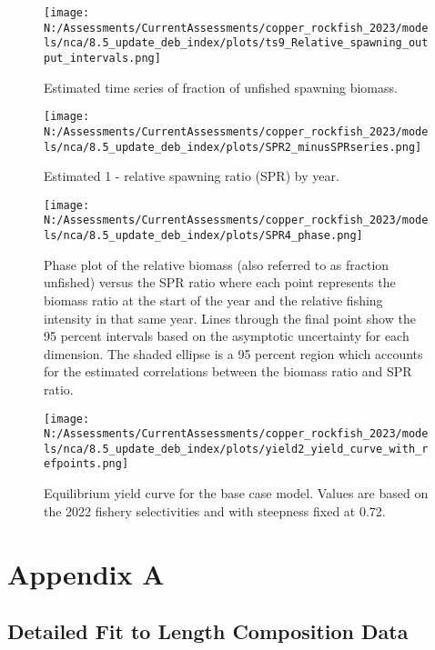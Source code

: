 \documentclass[11pt,
  english,
  letterpaper,
]{article}
\begin{document}
\begin{figure}
\centering
\texttt{[image: N:/Assessments/CurrentAssessments/copper\_rockfish\_2023/models/nca/8.5\_update\_deb\_index/plots/ts9\_Relative\_spawning\_output\_intervals.png]}
\caption{Estimated time series of fraction of unfished spawning biomass.\label{fig:depl}}
\end{figure}

\begin{figure}
\centering
\texttt{[image: N:/Assessments/CurrentAssessments/copper\_rockfish\_2023/models/nca/8.5\_update\_deb\_index/plots/SPR2\_minusSPRseries.png]}
\caption{Estimated 1 - relative spawning ratio (SPR) by year.\label{fig:1-spr}}
\end{figure}

\clearpage

\begin{figure}
\centering
\texttt{[image: N:/Assessments/CurrentAssessments/copper\_rockfish\_2023/models/nca/8.5\_update\_deb\_index/plots/SPR4\_phase.png]}
\caption{Phase plot of the relative biomass (also referred to as fraction unfished) versus the SPR ratio where each point represents the biomass ratio at the start of the year and the relative fishing intensity in that same year. Lines through the final point show the 95 percent intervals based on the asymptotic uncertainty for each dimension. The shaded ellipse is a 95 percent region which accounts for the estimated correlations between the biomass ratio and SPR ratio.\label{fig:phase}}
\end{figure}

\begin{figure}
\centering
\texttt{[image: N:/Assessments/CurrentAssessments/copper\_rockfish\_2023/models/nca/8.5\_update\_deb\_index/plots/yield2\_yield\_curve\_with\_refpoints.png]}
\caption{Equilibrium yield curve for the base case model. Values are based on the 2022 fishery selectivities and with steepness fixed at 0.72.\label{fig:yield}}
\end{figure}

\hypertarget{detailed-fit-comps}{%
\section{Appendix A}\label{detailed-fit-comps}}

\hypertarget{length-data}{%
\subsection{Detailed Fit to Length Composition Data}\label{length-data}}
\end{document}
